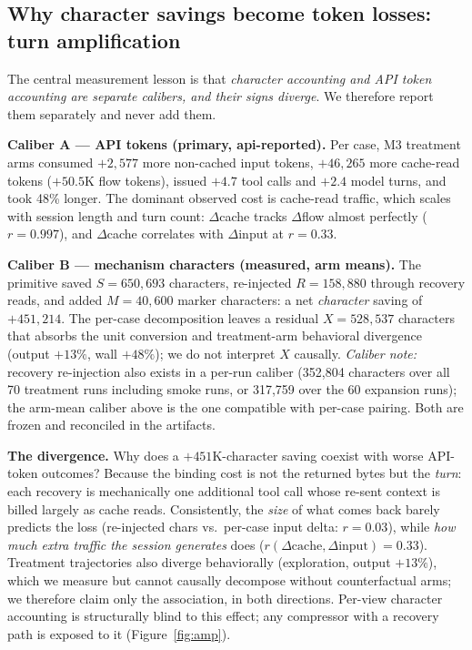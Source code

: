 \documentclass[twocolumn]{svjour3}       %
\begin{document}
\subsection{Why character savings become token losses: turn amplification}
\label{sec:g4}

The central measurement lesson is that \emph{character accounting and API token
accounting are separate calibers, and their signs diverge}. We therefore report them
separately and never add them.

\textbf{Caliber A --- API tokens (primary, api-reported).} Per case, M3 treatment arms
consumed $+2{,}577$ more non-cached input tokens, $+46{,}265$ more cache-read tokens
($+50.5$K flow tokens), issued $+4.7$ tool calls and $+2.4$ model turns, and took 48\%
longer. The dominant observed cost is cache-read traffic, which scales with session
length and turn count: $\Delta$cache tracks $\Delta$flow almost perfectly
($r{=}0.997$), and $\Delta$cache correlates with $\Delta$input at $r{=}0.33$.

\textbf{Caliber B --- mechanism characters (measured, arm means).} The primitive saved
$S = 650{,}693$ characters, re-injected $R = 158{,}880$ through recovery reads, and added
$M = 40{,}600$ marker characters: a net \emph{character} saving of $+451{,}214$. The
per-case decomposition leaves a residual $X = 528{,}537$ characters that absorbs the
unit conversion and treatment-arm behavioral divergence (output $+13\%$, wall $+48\%$);
we do not interpret $X$ causally. \emph{Caliber note:} recovery re-injection also exists
in a per-run caliber (352{,}804 characters over all 70 treatment runs including smoke
runs, or 317{,}759 over the 60 expansion runs); the arm-mean caliber above is the one
compatible with per-case pairing. Both are frozen and reconciled in the artifacts.

\textbf{The divergence.} Why does a $+451$K-character saving coexist with worse
API-token outcomes? Because the binding cost is not the returned bytes but the
\emph{turn}: each recovery is mechanically one additional tool call whose re-sent context
is billed largely as cache reads. Consistently, the \emph{size} of what comes back
barely predicts the loss (re-injected chars vs.\ per-case input delta: $r{=}0.03$),
while \emph{how much extra traffic the session generates} does
($r(\Delta\text{cache},\Delta\text{input}) = 0.33$). Treatment trajectories also diverge
behaviorally (exploration, output $+13\%$), which we measure but cannot causally
decompose without counterfactual arms; we therefore claim only the association, in both
directions. Per-view character accounting is structurally blind to this effect; any
compressor with a recovery path is exposed to it (Figure~\ref{fig:amp}).
\end{document}
